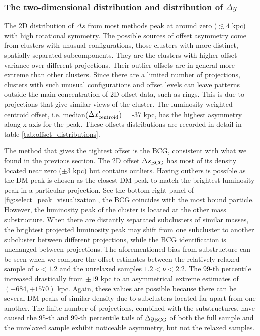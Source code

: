 \subsubsection{The two-dimensional distribution and distribution of $\Delta y$}
The 2D distribution of $\Delta s$ from most methods peak at
around zero ($\lesssim 4$ kpc) with high rotational symmetry. 
The possible sources of offset asymmetry come from clusters with unusual configurations,
those clusters with more distinct, spatially separated subcomponents.
They are the clusters with higher offset variance over different projections. 
Their outlier offsets are in general more extreme than other clusters.
Since there are a limited number of projections,
clusters with such unusual configurations and offset levels 
can leave patterns outside the main concentration of 2D offset data, such as rings. 
This is due to projections that give similar views of the cluster. 
The luminosity weighted centroid offset, i.e. median($\Delta x_{\rm
centroid}'$) = -37 kpc, has the highest asymmetry along x-axis for the peak.
These offsets distributions are recorded in detail in table
\ref{tab:offset_distributions}. 

The method that gives the tightest offset is the BCG, consistent with what we
found in the previous section. 
The 2D offset $\Delta s_{\rm BCG}$ has most of its density located near zero
($\pm 3$ kpc) but 
contains outliers. Having outliers is possible 
as the DM peak is chosen as the closest DM peak to match the
brightest luminosity peak in a particular projection.
See the bottom right panel of \ref{fig:select_peak_visualization}, the BCG 
coincides with the most bound particle. However, the luminosity peak of the
cluster is located at the other mass substructure. 
When there are distantly separated subclusters of similar masses, 
the brightest projected luminosity peak 
may shift from one subcluster to another subcluster between different projections,
while the BCG identification is unchanged between projections.
The aforementioned bias from substructure can be seen when we compare the
offset estimates between the relatively relaxed sample of $\nu < 1.2$ and the
unrelaxed samples $1.2 < \nu < 2.2$. The 99-th percentile increased drastically
from $\pm 19$ kpc to an asymmetrical extreme estimates of $(-684, +1570)$ kpc.
Again, these values are possible because there can be several DM peaks of
similar density due to subclusters located far apart from one another.
The finite number of projections, combined with the substructures, have caused 
the 95-th and 99-th percentile tails of $\Delta y_{\rm BCG}$ of both the full
sample and the unrelaxed sample exhibit noticeable asymmetry, 
but not the relaxed samples.


